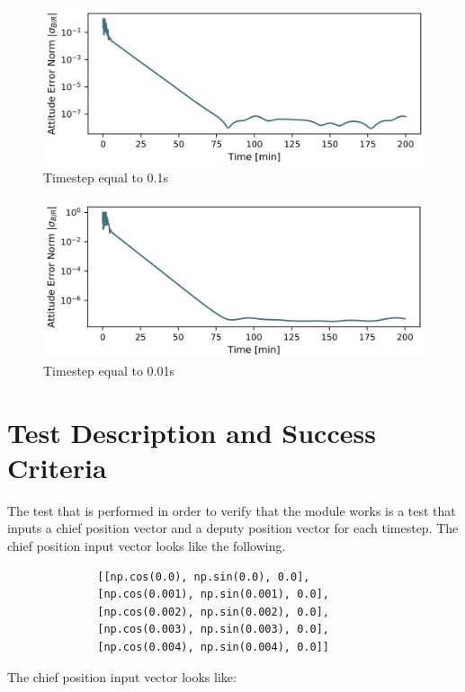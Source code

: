 \documentclass[]{AVSreport}
\begin{document}
\begin{figure}[htb]
	\centerline{
	\includegraphics[scale=0.3]{Figures/att_norm2.png}
	}
	\caption{Timestep equal to 0.1s}
\end{figure}

\begin{figure}[htb]
	\centerline{
	\includegraphics[scale=0.3]{Figures/att_norm3.png}
	}
	\caption{Timestep equal to 0.01s}
\end{figure}

\newpage

\section{Test Description and Success Criteria}

The test that is performed in order to verify that the module works is a test that inputs a chief position vector and a deputy position vector for each timestep. The chief position input vector looks like the following.

\begin{lstlisting}
              [[np.cos(0.0), np.sin(0.0), 0.0],
              [np.cos(0.001), np.sin(0.001), 0.0],
              [np.cos(0.002), np.sin(0.002), 0.0],
              [np.cos(0.003), np.sin(0.003), 0.0],
              [np.cos(0.004), np.sin(0.004), 0.0]]
\end{lstlisting}

The chief position input vector looks like:
\end{document}
